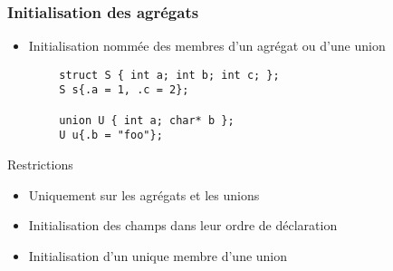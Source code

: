\documentclass[C++.tex]{subfiles}
\begin{document}
\begin{frame}[fragile]
	\frametitle{Initialisation des agrégats}
	\begin{itemize}
		\item Initialisation nommée des membres d'un agrégat ou d'une union

	\end{itemize}

	\begin{verbatim}
		struct S { int a; int b; int c; }; 
		S s{.a = 1, .c = 2};

		union U { int a; char* b };
		U u{.b = "foo"};
	\end{verbatim}

	\begin{alertblock}{Restrictions}
		\begin{itemize}
			\item Uniquement sur les agrégats et les unions
			\item Initialisation des champs dans leur ordre de déclaration
			\item Initialisation d'un unique membre d'une union

		\end{itemize}
	\end{alertblock}


\end{frame}
\end{document}
